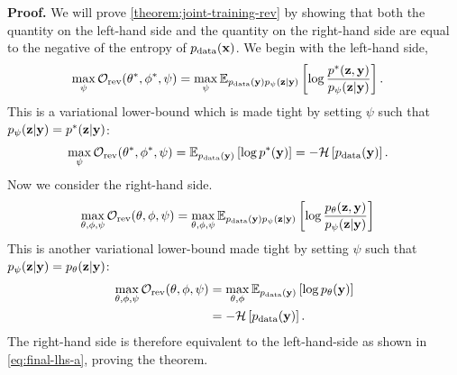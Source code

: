 \textbf{Proof.} We will prove \cref{theorem:joint-training-rev} by showing that
both the quantity on the left-hand side and the quantity on the right-hand side
are equal to the negative of the entropy of $p_{\rm{data}} ({\mathbf{x}})$. We begin with the
left-hand side,
\begin{align}
  \max_{\psi } \mathcal{O}_\text{rev}({\theta}^*, {\phi}^*, \psi ) &= \max_{\psi } \mathbb{E}_{p_{\rm{data}} ({\mathbf{y}})p_\psi({\mathbf{z}}|{\mathbf{y}})} \left[ \log\frac{{p}^*{}({\mathbf{z}},{\mathbf{y}})}{p_\psi({\mathbf{z}}|{\mathbf{y}})} \right].
\end{align}
This is a variational lower-bound which is made tight by setting $\psi $
such that $p_\psi({\mathbf{z}}|{\mathbf{y}}) = {p}^*{}({\mathbf{z}}|{\mathbf{y}})$:
\begin{align}
  \max_{\psi } \mathcal{O}_\text{rev}({\theta}^*, {\phi}^*, \psi ) &= \mathbb{E}_{p_{\rm{data}} ({\mathbf{y}})} \left[ \log {p}^*({\mathbf{y}}) \right] = - \mathcal{H} \left[ p_{\rm{data}} ({\mathbf{y}}) \right]. \label{eq:final-lhs-a}
\end{align}
Now we consider the right-hand side.
\begin{align}
  \max_{\theta, \phi, \psi } \mathcal{O}_\text{rev}(\theta, \phi, \psi ) &= \max_{\theta, \phi, \psi } \mathbb{E}_{p_{\rm{data}} ({\mathbf{y}})p_\psi({\mathbf{z}}|{\mathbf{y}})} \left[ \log\frac{p_\theta({\mathbf{z}},{\mathbf{y}})}{p_\psi({\mathbf{z}}|{\mathbf{y}})} \right]
\end{align}
This is another variational lower-bound made tight by setting $\psi $
such that $p_\psi({\mathbf{z}}|{\mathbf{y}}) = p_\theta({\mathbf{z}}|{\mathbf{y}})$:
\begin{align}
  \max_{\theta, \phi, \psi } \mathcal{O}_\text{rev}(\theta, \phi, \psi ) &= \max_{\theta, \phi} \mathbb{E}_{p_{\rm{data}} ({\mathbf{y}})} \left[ \log p_\theta({\mathbf{y}}) \right] \\
                                                                                   &= - \mathcal{H} \left[ p_{\rm{data}} ({\mathbf{y}}) \right].
\end{align}
The right-hand side is therefore equivalent to the left-hand-side as shown in
\cref{eq:final-lhs-a}, proving the theorem.




